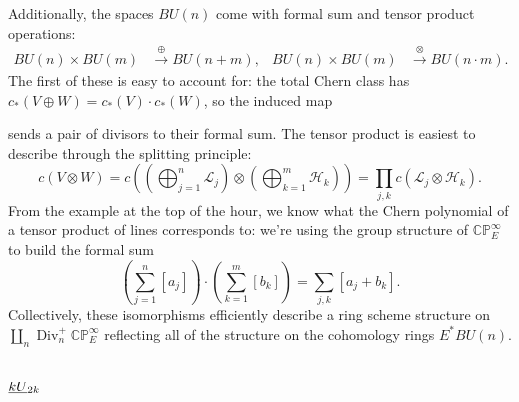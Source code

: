 \documentclass{amsart}
\newcommand{\C}{\mathbb{C}}
\newcommand{\CP}{\C\P}
\renewcommand{\L}{\mathcal{L}}
\renewcommand{\H}{\mathcal{H}}
\renewcommand{\P}{\mathbb{P}}
\newcommand{\<}{\langle}
\renewcommand{\>}{\rangle}
\newcommand{\OS}[2]{\smash{\underline{#1}}_{#2}}
\DeclareMathOperator{\Div}{Div}
\theoremstyle{plain}
\theoremstyle{definition}
\theoremstyle{remark}
\begin{document}
Additionally, the spaces $BU(n)$ come with formal sum and tensor product operations:
\begin{align*}
BU(n) \times BU(m) & \xrightarrow{\oplus} BU(n+m), & BU(n) \times BU(m) & \xrightarrow{\otimes} BU(n \cdot m).
\end{align*}
The first of these is easy to account for: the total Chern class has $c_*(V \oplus W) = c_*(V) \cdot c_*(W)$, so the induced map
\begin{center}
\end{center}
sends a pair of divisors to their formal sum.  The tensor product is easiest to describe through the splitting principle:
\[
c(V \otimes W) = c\left( \left( \bigoplus_{j=1}^n \L_j\right) \otimes \left( \bigoplus_{k=1}^m \H_k \right)\right) = \prod_{j, k} c(\L_j \otimes \H_k).
\]
From the example at the top of the hour, we know what the Chern polynomial of a tensor product of lines corresponds to: we're using the group structure of $\CP^\infty_E$ to build the formal sum \[\left( \sum_{j=1}^n [a_j] \right) \cdot \left( \sum_{k=1}^m [b_k]\right) = \sum_{j,k} [a_j + b_k].\]  Collectively, these isomorphisms efficiently describe a ring scheme structure on $\coprod_n \Div_n^+ \CP^\infty_E$ reflecting all of the structure on the cohomology rings $E^* BU(n)$.



\section{$\OS{kU}{2k}$}
\end{document}
